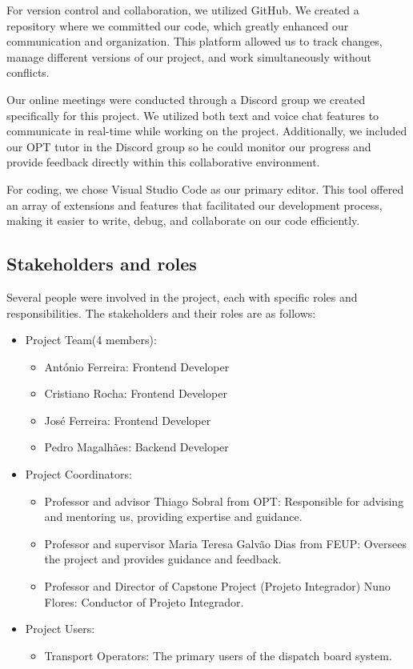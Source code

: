 \documentclass{article}
\begin{document}
For version control and collaboration, we utilized GitHub. We created a repository where we committed our code, which greatly enhanced our communication and organization. This platform allowed us to track changes, manage different versions of our project, and work simultaneously without conflicts.

Our online meetings were conducted through a Discord group we created specifically for this project. We utilized both text and voice chat features to communicate in real-time while working on the project. Additionally, we included our OPT tutor in the Discord group so he could monitor our progress and provide feedback directly within this collaborative environment.

For coding, we chose Visual Studio Code as our primary editor. This tool offered an array of extensions and features that facilitated our development process, making it easier to write, debug, and collaborate on our code efficiently.

\subsection{Stakeholders and roles}
Several people were involved in the project, each with specific roles and responsibilities. The stakeholders and their roles are as follows:
\begin{itemize}
    \item Project Team(4 members):
    \begin{itemize}
        \item António Ferreira: Frontend Developer
        \item Cristiano Rocha: Frontend Developer
        \item José Ferreira: Frontend Developer
        \item Pedro Magalhães: Backend Developer
    \end{itemize}
    \item Project Coordinators:
    \begin{itemize}
        \item Professor and advisor Thiago Sobral from OPT: Responsible for advising and mentoring us, providing expertise and guidance.
        \item Professor and supervisor Maria Teresa Galvão Dias from FEUP: Oversees the project and provides guidance and feedback.
        \item Professor and Director of Capstone Project (Projeto Integrador) Nuno Flores: Conductor of Projeto Integrador.
    \end{itemize}
    \item Project Users:
    \begin{itemize}
        \item Transport Operators: The primary users of the dispatch board system.
    \end{itemize}
\end{itemize}
\end{document}
